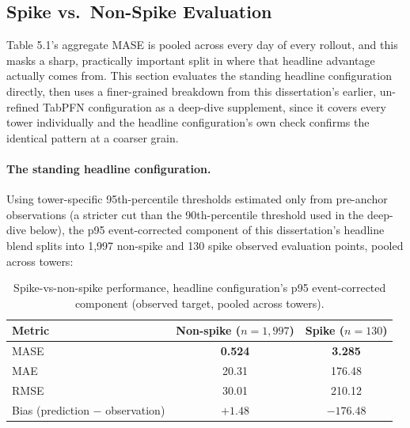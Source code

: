 \subsection{Spike vs.\ Non-Spike Evaluation}

Table 5.1's aggregate MASE is pooled across every day of every rollout, and this masks a sharp,
practically important split in where that headline advantage actually comes from. This section
evaluates the standing headline configuration directly, then uses a finer-grained breakdown from
this dissertation's earlier, un-refined TabPFN configuration as a deep-dive supplement, since it
covers every tower individually and the headline configuration's own check confirms the identical
pattern at a coarser grain.

\paragraph{The standing headline configuration.} Using tower-specific 95th-percentile thresholds
estimated only from pre-anchor observations (a stricter cut than the 90th-percentile threshold used
in the deep-dive below), the p95 event-corrected component of this dissertation's headline blend
splits into 1,997 non-spike and 130 spike observed evaluation points, pooled across towers:

\begin{table}[htbp]
\centering
\begin{tabular}{lcc}
\toprule
Metric & Non-spike ($n=1{,}997$) & Spike ($n=130$) \\
\midrule
MASE & \textbf{0.524} & \textbf{3.285} \\
MAE & 20.31 & 176.48 \\
RMSE & 30.01 & 210.12 \\
Bias (prediction $-$ observation) & $+1.48$ & \textbf{$-176.48$} \\
\bottomrule
\end{tabular}
\caption{Spike-vs-non-spike performance, headline configuration's p95 event-corrected component
(observed target, pooled across towers).}
\end{table}


